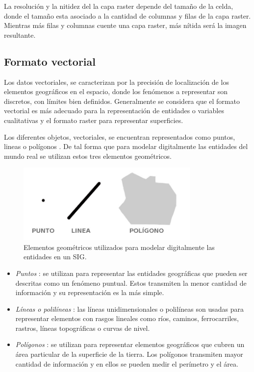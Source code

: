 La resolución y la nitidez del la capa raster depende del tamaño de la celda, donde el tamaño esta
asociado a la cantidad de columnas y filas de la capa raster. Mientras más filas y columnas cuente
una capa raster, más nítida será la imagen resultante.

\subsection{Formato vectorial}
Los datos vectoriales, se caracterizan por la precisión de localización de los elementos
geográficos en el espacio, donde los fenómenos a representar son discretos, con límites bien
definidos. Generalmente se considera que el formato vectorial es más adecuado para la
representación de entidades o variables cualitativas y el formato raster para representar
superficies\citep{fAlonsoSig2006}.

Los diferentes objetos, vectoriales, se encuentran representados como puntos, lineas o polígonos
\citep{fAlonsoSig2006}. De tal forma que para modelar digitalmente las entidades del mundo real se
utilizan estos tres elementos geométricos.

\begin{figure}
\centering
\includegraphics[width=0.8\textwidth]{capitulo-2/graphics/dimensiones-datos.jpg}
\caption{\label{fig:sig-xyz} Elementos geométricos utilizados para modelar digitalmente las entidades en un SIG.}
\end{figure}

\begin{itemize}
    \item \textit{Puntos} : se utilizan para representar las entidades geográficas que pueden ser
    descritas como un fenómeno puntual. Estos transmiten la menor cantidad de información y su representación es la más simple.

    \item \textit{Líneas o polilíneas} : las líneas unidimensionales o polilíneas son usadas para
    representar elementos con rasgos lineales como ríos, caminos, ferrocarriles, rastros, líneas
    topográficas o curvas de nivel.

    \item \textit{Polígonos} : se utilizan para representar elementos geográficos que cubren un
    área particular de la superficie de la tierra. Los polígonos transmiten mayor cantidad de
    información y en ellos se pueden medir el perímetro y el área.
\end{itemize}

